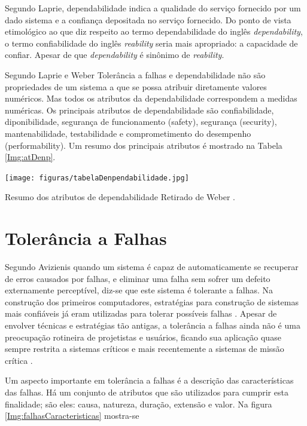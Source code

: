 \documentclass[a4paper,12pt,brazil]{ufms-cpcx}
\begin{document}
Segundo Laprie, dependabilidade indica a qualidade do serviço fornecido por um dado sistema e a confiança depositada no serviço fornecido. Do ponto de vista etimológico ao que diz respeito ao termo dependabilidade do inglês \textit{dependability}, o termo confiabilidade do inglês \textit{reability} seria mais apropriado: a capacidade de confiar. Apesar de que \textit{dependability} é sinônimo de \textit{reability}. 

Segundo Laprie e Weber \cite{Weber:2002} Tolerância a falhas e dependabilidade não são propriedades de um sistema a que se possa atribuir diretamente valores numéricos. Mas todos os atributos da dependabilidade correspondem a medidas numéricas. Os principais atributos de dependabilidade são confiabilidade, diponibilidade, segurança de funcionamento (safety), segurança (security), mantenabilidade, testabilidade
e comprometimento do desempenho (performability). Um resumo dos principais
atributos é mostrado na Tabela \ref{Img:atDenp}.     

\begin{table}
	\centering
	\texttt{[image: figuras/tabelaDenpendabilidade.jpg]}
	\caption{Resumo dos atributos de dependabilidade Retirado de Weber \cite{Weber:2002}.}
	\label{Img:atDenp}	
\end{table}


      
\section{Tolerância a Falhas}

Segundo Avizienis \cite{Avizienis:1984} quando um sistema é capaz de automaticamente se recuperar de erros causados por falhas, e eliminar uma falha sem sofrer um defeito externamente perceptível, diz-se que este sistema é tolerante a falhas. Na construção dos primeiros computadores, estratégias para construção de sistemas mais confiáveis já eram utilizadas para tolerar possíveis falhas \cite{VonNewmann:1956}. Apesar de envolver técnicas e estratégias tão antigas, a tolerância a falhas ainda não é uma preocupação rotineira de projetistas e usuários, ficando sua aplicação quase sempre restrita a sistemas críticos e mais recentemente a sistemas de missão crítica \cite{Weber:2002}.

Um aspecto importante em tolerância a falhas é a descrição das características das falhas. Há um conjunto de atributos que são utilizados para cumprir esta finalidade; são eles: causa, natureza, duração, extensão e valor. Na figura \ref{Img:falhasCaracteristicas} mostra-se 
\end{document}
